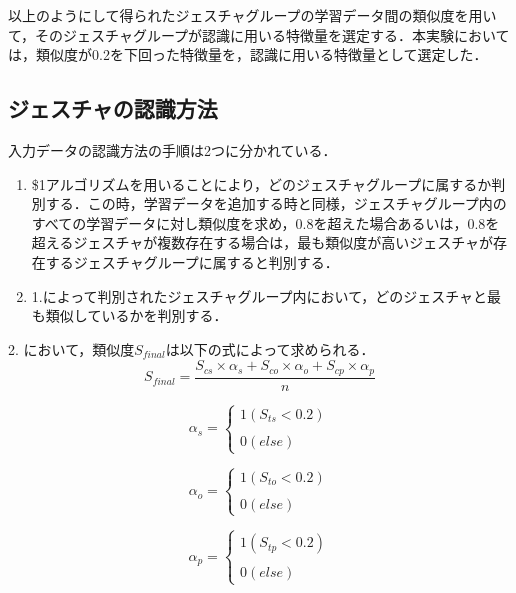 以上のようにして得られたジェスチャグループの学習データ間の類似度を用いて，そのジェスチャグループが認識に用いる特徴量を選定する．本実験においては，類似度が0.2を下回った特徴量を，認識に用いる特徴量として選定した．


\subsection{ジェスチャの認識方法}
入力データの認識方法の手順は2つに分かれている．
\begin{enumerate}
\item \$1アルゴリズムを用いることにより，どのジェスチャグループに属するか判別する．この時，学習データを追加する時と同様，ジェスチャグループ内のすべての学習データに対し類似度を求め，0.8を超えた場合あるいは，0.8を超えるジェスチャが複数存在する場合は，最も類似度が高いジェスチャが存在するジェスチャグループに属すると判別する．
\item 1.によって判別されたジェスチャグループ内において，どのジェスチャと最も類似しているかを判別する．
\end{enumerate}
2. において，類似度$S_\textit{final}$は以下の式によって求められる．
\begin{equation}
S_\textit{final} = \frac{S_\textit{cs} \times α_\textit{s} + S_\textit{co} \times α_\textit{o} + S_\textit{cp} \times α_\textit{p}}{n}
\end{equation}

\begin{equation}
α_\textit{s}= \left \{
\begin{array}{l}
1 (S_\textit{ts}<0.2) \\\\
0 (else)
\end{array}
\right.
\end{equation}

\begin{equation}
α_\textit{o}= \left \{
\begin{array}{l}
1 (S_\textit{to}<0.2) \\\\
0 (else)
\end{array}
\right.
\end{equation}

\begin{equation}
α_\textit{p} = \left \{
\begin{array}{l}
1 (S_\textit{tp}<0.2) \\\\
0 (else)
\end{array}
\right.
\end{equation}


